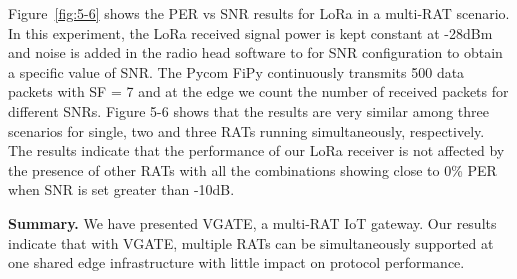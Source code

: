 \documentclass[10pt,emptycopyrightspace]{ewsn-proc}
\newcommand{\fakepar}[1]{\noindent\textbf{#1.}}
\begin{document}
Figure~\ref{fig:5-6} shows the PER vs SNR results for LoRa in a
multi-RAT scenario. In this experiment, the LoRa received signal power
is kept constant at -28dBm and noise is added in the radio head
software to for SNR configuration to obtain a specific value of
SNR. The Pycom FiPy continuously transmits 500 data packets with SF =
7 and at the edge we count the number of received packets for
different SNRs. Figure 5-6 shows that the results are very similar
among three scenarios for single, two and three RATs running
simultaneously, respectively. The results indicate that the performance of our
LoRa receiver is not affected by the presence of other RATs with all
the combinations showing close to 0\% PER when SNR is set greater than
-10dB.

\fakepar{Summary} We have presented VGATE, a multi-RAT IoT gateway.
Our results indicate that with VGATE, multiple RATs can be
simultaneously supported at one shared edge infrastructure
with little impact on protocol performance.





%
%
\balance

\end{document}
